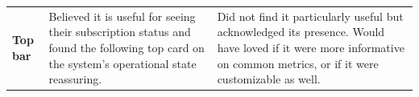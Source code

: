\documentclass{imc-inf}
\begin{document}
\begin{longtable}{@{}>{\raggedright\arraybackslash}p{3cm}p{5.75cm}p{5.75cm}@{}}
  \textbf{Top bar}                                                                                                                                                                                                                                                                                                                                                                                                                                                                                                                                                                                                                                                                                                                                                                                                                                                                                             &
  Believed it is useful for seeing their subscription status and found the following top card on the system's operational state reassuring.                                                                                                                                                                                                                                                                                                                                                                                                                                                                                                                                                                                                                                                                                                                                                                    &
  Did not find it particularly useful but acknowledged its presence. Would have loved if it were more informative on common metrics, or if it were customizable as well.                                                                                                                                                                                                                                                                                                                                                                                                                                                                                                                                                                                                                                                                                                                                                                                   \\[6pt]


\end{longtable}
\end{document}
